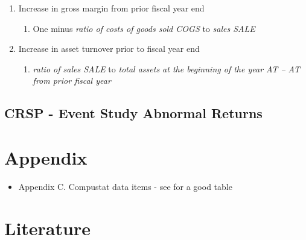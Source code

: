 \documentclass[12pt]{article}
\begin{document}
\begin{enumerate}
\begin{enumerate}
                \item Increase in gross margin from prior fiscal year end 

                    \begin{enumerate}
                        \item One minus \emph{ratio of costs of goods sold COGS} to \emph{sales SALE}
                    \end{enumerate}

                \item Increase in asset turnover prior to fiscal year end 

                    \begin{enumerate}
                        \item \emph{ratio of sales SALE} to \emph{total assets at the beginning of the year AT -- AT from prior fiscal year}
                    \end{enumerate}


            \end{enumerate}
                    
            

    \end{enumerate}


    \subsection{CRSP - Event Study Abnormal Returns}

\section{Appendix}

    \begin{itemize}
        \item Appendix C. Compustat data items - see for a good table \citet{Andrade2004}
    \end{itemize}

\section{Literature}


\end{document}
